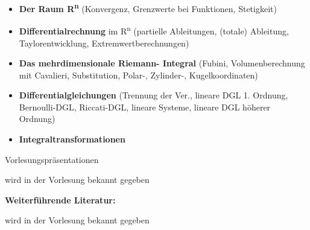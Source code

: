 \begin{course}
\begin{content}
\begin{itemize}\item \textbf{Der Raum R\textsuperscript{n}} (Konvergenz, Grenzwerte bei Funktionen, Stetigkeit)  \item \textbf{Differentialrechnung} im R\textsuperscript{n} (partielle Ableitungen, (totale) Ableitung, Taylorentwicklung, Extremwertberechnungen)  \item \textbf{Das mehrdimensionale Riemann- Integral} (Fubini, Volumenberechnung mit Cavalieri, Substitution, Polar-, Zylinder-, Kugelkoordinaten)  \item \textbf{Differentialgleichungen} (Trennung der Ver., lineare DGL 1. Ordnung, Bernoulli-DGL, Riccati-DGL, lineare Systeme, lineare DGL höherer Ordnung)  \item \textbf{Integraltransformationen}  \end{itemize}
\end{content}

\begin{media}Vorlesungspräsentationen

\end{media}

\begin{literature}wird in der Vorlesung bekannt gegeben

\textbf{Weiterführende Literatur:}

wird in der Vorlesung bekannt gegeben

\end{literature}



\end{course}